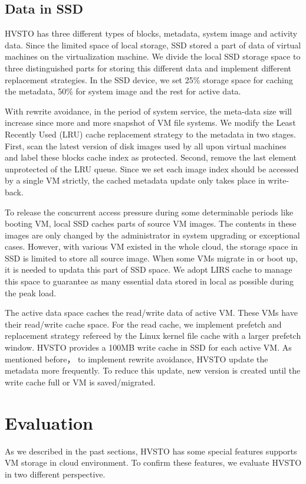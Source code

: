 \documentclass[conference]{IEEEtran}
\begin{document}
\subsection{Data in SSD}
HVSTO has three different types of blocks, metadata, system image and activity data. Since the limited space of local storage, SSD stored a part of data of virtual machines on the virtualization machine. We divide the local SSD storage space to three distinguished parts for storing this different data and implement different replacement strategies. In the SSD device, we set 25\% storage space for caching the metadata, 50\% for system image and the rest for active data.

With rewrite avoidance, in the period of system service, the meta-data size will increase since more and more snapshot of VM file systems. We modify the Least Recently Used (LRU) cache replacement strategy to the metadata in two stages. First, scan the latest version of disk images used by all upon virtual machines and label these blocks cache index as protected. Second, remove the last element unprotected of the LRU queue. Since we set each image index should be accessed by a single VM strictly, the cached metadata update only takes place in write-back.

To release the concurrent access pressure during some determinable periods like booting VM, local SSD caches parts of source VM images. The contents in these images are only changed by the administrator in system upgrading or exceptional cases. However, with various VM existed in the whole cloud, the storage space in SSD is limited to store all source image. When some VMs migrate in or boot up, it is needed to updata this part of SSD space. We adopt LIRS cache \cite{Jiang2002} to manage this space to guarantee as many essential data stored in local as possible during the peak load.

The active data space caches the read/write data of active VM.  These VMs have their read/write cache space. For the read cache, we implement prefetch and replacement strategy refereed by the Linux kernel file cache with a larger prefetch window. HVSTO provides a 100MB write cache in SSD for each active VM. As mentioned before， to implement rewrite avoidance, HVSTO update the metadata more frequently. To reduce this update, new version is created until the write cache full or VM is saved/migrated. 


\section{Evaluation}
\label{sec:eva}
As we described in the past sections, HVSTO has some special features supports VM storage in cloud environment. To confirm these features, we evaluate HVSTO in two different perspective. 
\end{document}
